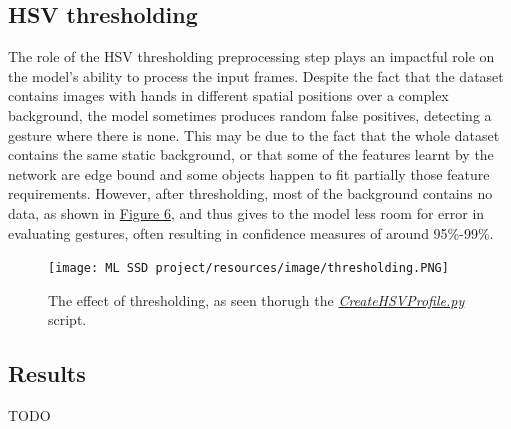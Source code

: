 \documentclass[10pt,twocolumn,letterpaper]{article}
\begin{document}
\subsection{HSV thresholding}
\begin{flushleft}
The role of the HSV thresholding preprocessing step plays an impactful role on the model's ability to process the input frames. Despite the fact that the dataset contains images with hands in different spatial positions over a complex background, the model sometimes produces random false positives, detecting a gesture where there is none. This may be due to the fact that the whole dataset contains the same static background, or that some of the features learnt by the network are edge bound and some objects happen to fit partially those feature requirements. However, after thresholding, most of the background contains no data, as shown in \hyperref[figure6]{Figure 6}, and thus gives to the model less room for error in evaluating gestures, often resulting in confidence measures of around 95\%-99\%.

\begin{figure}[!h]
    \centering
    \texttt{[image: ML SSD project/resources/image/thresholding.PNG]} \caption{The effect of thresholding, as seen thorugh the \textit{\href{https://github.com/MarzioVallero/ML-Based-Blender-Gestural-Input-Interface/blob/master/CreateHSVProfile.py}{CreateHSVProfile.py}} script.}
\end{figure}
\label{figure6}

\end{flushleft}
\subsection{Results}
\begin{flushleft}
TODO
\end{flushleft}
\end{document}
